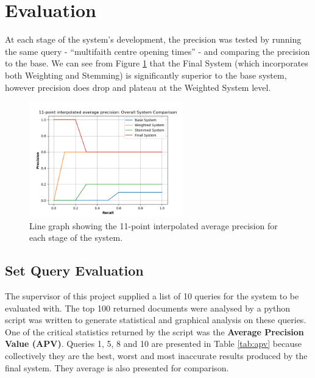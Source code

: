 \documentclass{sig-alternate}
\begin{document}
	\section{Evaluation} \label{sec:eval}
	At each stage of the system's development, the precision was tested by running the same query - ``multifaith centre opening times'' - and comparing the precision to the base. We can see from Figure \ref{fig:comparison-line} that the Final System (which incorporates both Weighting and Stemming) is significantly superior to the base system, however precision does drop and plateau at the Weighted System level.
	
	\begin{figure}
		\includegraphics[width=1\linewidth, height=5cm,]{p11-overall.PNG}
		\caption{Line graph showing the 11-point interpolated average precision for each stage of the system.}
		\label{fig:comparison-line}
	\end{figure}

		\subsection{Set Query Evaluation} \label{sec:eval-setQeval}
		The supervisor of this project supplied a list of 10 queries for the system to be evaluated with. The top 100 returned documents were analysed by a python script was written to generate statistical and graphical analysis on these queries. One of the critical statistics returned by the script was the \textbf{Average Precision Value (APV)}. Queries 1, 5, 8 and 10 are presented in Table \ref{tab:apv} because collectively they are the best, worst and most inaccurate results produced by the final system. They average is also presented for comparison.
		
\end{document}
